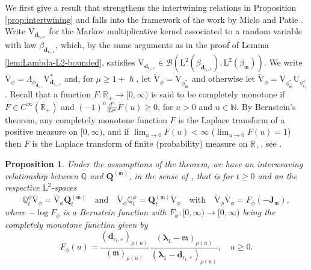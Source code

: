 \documentclass[JEP,XML,SOM,Unicode]{cedram}
\let\epsilon\varepsilon
\theoremstyle{plain}
\newtheorem{proposition}[theorem]{Proposition}
\theoremstyle{definition}
\newcommand{\N}{\mathbb{N}}
\newcommand{\R}{\mathbb{R}}
\newcommand{\J}{\mathds{Q}}
\newcommand{\Leb}{\mathrm{L}}
\newcommand{\calJd}{\mathbf{J}}
\newcommand{\m}{\mathfrak{m}}
\newcommand{\dpt}{\bm{d}_{\vat,\epsilon}}
\newcommand{\dz}{{\bm{d}}_{1,\epsilon}}
\newcommand{\Bop}[2]{\mathcal{B}(#1,#2)}
\newcommand{\lam}{{\bm{\lambda}_1}}
\newcommand{\vat}{{\mathsf{r}_1}}
\newcommand{\phm}{{\phi_\m^*}}
\renewcommand{\varphi}{{\phi_{\vat}^{\checkmark}}}
\newcommand{\Q}[1][\mo]{\mathbf{Q}^{({#1})}}
\newcommand{\gab}[1][\lam,\mo]{{\beta_{#1}}}
\let\h\hslash
\let\mo\mu
\begin{document}
We first give a result that strengthens the intertwining relations in Proposition \ref{prop:intertwining} and falls into the framework of the work by Miclo and Patie \cite{Patie-Miclo}. Write $\mathrm{V}_{\dpt}$ for the Markov multiplicative kernel associated to a random variable with law $\gab[\dpt]$, which, by the same arguments as in the proof of Lemma \ref{lem:Lambda-L2-bounded}, satisfies $\mathrm{V}_{\dpt} \in \Bop{\Leb^2(\gab[\dpt])}{\Leb^2(\gab[\m])}$. We write $\overline{\mathrm{V}}_\phi = \Lambda_{\phi_{\dz}} \mathrm{V}_{\dpt}^*$ and, for $\mo \geq 1+\h$, let $\widetilde{\mathrm{V}}_\phi = \mathrm{V}_{\phm}$ and otherwise let $\widetilde{\mathrm{V}}_\phi = \mathrm{V}_{\phm} \mathrm{U}_\varphi$. Recall that a function $F:\R_+ \to [0,\infty)$ is said to be completely monotone if $F \in C^\infty(\R_+)$ and $(-1)^n \frac{d^n}{dx^n} F(u) \geq 0$, for $u > 0$ and $n \in \N$. By Bernstein's theorem, any completely monotone function $F$ is the Laplace transform of a positive measure on $[0,\infty)$, and if $\lim_{u \to 0} F(u) < \infty$ (\resp $\lim_{u \to 0} F(u) =1$) then $F$ is the Laplace transform of finite (\resp probability) measure on $\R_+$, see \eg \cite[Chap.\,1]{SchillingSongVondracek10}.

\begin{proposition}
\label{prop:cmir}
Under the assumptions of the theorem, we have an interweaving relationship between $\J$ and $\Q[\m]$, in the sense of \cite{Patie-Miclo}, that is for $t \geq 0$ and on the respective $\Leb^2$-spaces
\begin{equation}
\label{eq:cmir}
\J_t^\phi \overline{\mathrm{V}}_\phi = \overline{\mathrm{V}}_\phi \Q[\m]_t \quad \text{and} \quad \widetilde{\mathrm{V}}_\phi \J_t^\phi = \Q[\m]_t \widetilde{\mathrm{V}}_\phi \quad \text{with} \quad \widetilde{\mathrm{V}}_\phi \overline{\mathrm{V}}_\phi = F_\phi(-\calJd_\m),
\end{equation}
where $-\log F_\phi$ is a Bernstein function with $F_\phi:[0,\infty) \to [0,\infty)$ being the completely monotone function given by
\begin{equation*}
F_\phi(u) = \frac{(\dpt)_{\rho(u)}}{(\m)_{\rho(u)}}\, \frac{(\lam-\m)_{\rho(u)}}{(\lam-\dpt)_{\rho(u)}} , \quad u \geq 0.
\end{equation*}
\end{proposition}
\end{document}
